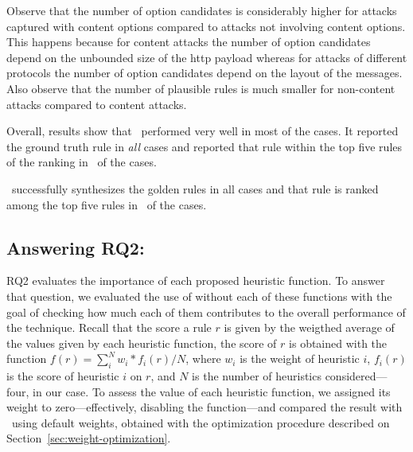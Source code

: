 \documentclass[sigconf,review, anonymous]{acmart}
\begin{document}
Observe that the number of option candidates is considerably higher
for attacks captured with content options compared to attacks not
involving content options. This happens because for content attacks
the number of option candidates depend on the unbounded size of the
http payload whereas for attacks of different protocols the number of
option candidates depend on the layout of the messages. Also observe
that the number of plausible rules is much smaller for non-content
attacks compared to content attacks.


Overall, results show that \tname\ performed very well in most of the
cases. It reported the ground truth rule in \emph{all} cases and
reported that rule within the top five rules of the ranking in
\percTopFiveRanking\ of the cases. 


\begin{center}
\begin{tcolorbox}[enhanced,width=3.3in,center upper,drop shadow southwest,sharp corners]
\tname\ successfully synthesizes the golden rules in all cases and
that rule is ranked among the top five rules in
\percTopFiveRanking\ of the cases.
\end{tcolorbox}
\end{center}


\subsection{Answering RQ2: \textRQtwo}
\label{sec:answer-rqtwo}

RQ2 evaluates the importance of each proposed heuristic function. To
answer that question, we evaluated the use of \tname{} without each of
these functions with the goal of checking how much each of them
contributes to the overall performance of the technique. Recall that
the score a rule $r$ is given by the weigthed average of the values
given by each heuristic function, \ie{} the score of $r$ is obtained
with the function $f(r)=\sum_{i}^{N} w_i*f_i(r)/N$, where $w_i$ is the
weight of heuristic $i$, $f_i(r)$ is the score of heuristic $i$ on
$r$, and $N$ is the number of heuristics considered---four, in our
case. To assess the value of each heuristic function, we assigned its
weight to zero---effectively, disabling the function---and compared
the result with \tname\ using default weights, obtained with the
optimization procedure described on
Section~\ref{sec:weight-optimization}.
\end{document}
